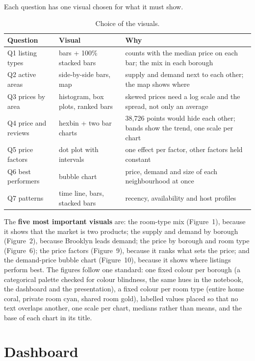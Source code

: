 \documentclass[12pt,a4paper]{article}
\begin{document}
Each question has one visual chosen for what it must show.

\begin{table}[H]\centering\small
\caption{Choice of the visuals.}
\begin{tabularx}{\linewidth}{@{}llX@{}}
\toprule
Question & Visual & Why\\\midrule
Q1 listing types & bars + 100\% stacked bars & counts with the median price on each bar; the mix in each borough\\
Q2 active areas & side-by-side bars, map & supply and demand next to each other; the map shows where\\
Q3 prices by area & histogram, box plots, ranked bars & skewed prices need a log scale and the spread, not only an average\\
Q4 price and reviews & hexbin + two bar charts & 38{,}726 points would hide each other; bands show the trend, one scale per chart\\
Q5 price factors & dot plot with intervals & one effect per factor, other factors held constant\\
Q6 best performers & bubble chart & price, demand and size of each neighbourhood at once\\
Q7 patterns & time line, bars, stacked bars & recency, availability and host profiles\\
\bottomrule
\end{tabularx}
\end{table}

The \textbf{five most important visuals} are: the room-type mix (Figure~1), because it shows that the
market is two products; the supply and demand by borough (Figure~2), because Brooklyn leads demand;
the price by borough and room type (Figure~6); the price factors (Figure~9), because it ranks what
sets the price; and the demand-price bubble chart (Figure~10), because it shows where listings
perform best. The figures follow one standard: one fixed colour per borough (a categorical palette
checked for colour blindness, the same hues in the notebook, the dashboard and the presentation), a
fixed colour per room type (entire home coral, private room cyan, shared room gold), labelled values
placed so that no text overlaps another, one scale per chart, medians rather than means, and the base
of each chart in its title.

\section{Dashboard}\label{sec:dash}
\end{document}
